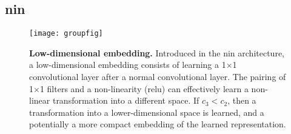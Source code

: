 \documentclass[thesis]{subfiles}
\begin{document}
\subsection{\gls{nin}}
\begin{figure}[tbp]
    \centering
    \texttt{[image: groupfig]}
    \caption[Low-dimensional embedding]{\textbf{Low-dimensional embedding.} Introduced in the \gls{nin} architecture, a low-dimensional embedding consists of learning a 1$\times$1 convolutional layer after a normal convolutional layer. The pairing of 1$\times$1 filters and a non-linearity (\ie{}\gls{relu}) can effectively learn a non-linear transformation into a different space. If $c_3 < c_2$, then a transformation into a lower-dimensional space is learned, and a potentially a more compact embedding of the learned representation.}\label{fig:lowdimembedding}
\end{figure}
\end{document}
